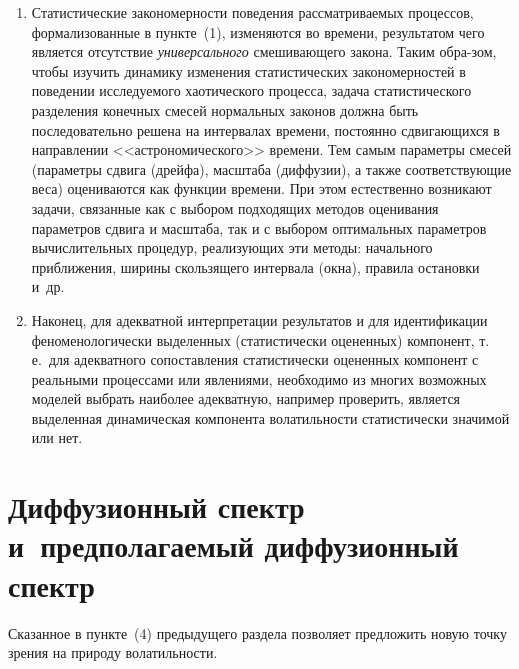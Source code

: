 \begin{multicols}{2}
\begin{enumerate}[(1)]
\item Статистические закономерности поведения
рассматриваемых процессов, формализованные в пункте~(1),
изменяются во времени, результатом чего является отсутствие {\it
универсального} сме\-ши\-ва\-юще\-го закона. Таким обра-\linebreak зом, чтобы изучить
динамику изменения статистических закономерностей в поведении\linebreak
ис\-сле\-ду\-емо\-го хаотического процесса, задача статистического
разделения конечных смесей нормальных законов должна быть
последовательно решена на интервалах времени, постоянно
сдви\-га\-ющих\-ся в направлении <<астрономического>> времени. Тем самым
параметры смесей (параметры сдвига (дрейфа), масштаба (диффузии),
а также соответствующие веса) оцениваются как функции времени. При
этом естественно возникают задачи, связанные как с выбором
подходящих методов оценивания параметров сдвига и масштаба, так и
с выбором оптимальных па\-ра\-мет\-ров вычислительных процедур,
реализующих эти методы: начального приближения, ширины скользящего
интервала (окна), правила остановки и~др.

\item Наконец, для адекватной интерпретации результатов и
для идентификации феноменологически выделенных (статистически
оцененных) компонент, т.\,е.\ для адекватного сопоставления
статистически оцененных компонент с реальными процессами или
явлениями, необходимо из многих возможных моделей выбрать наиболее
адекватную, например проверить, является выделенная динамическая
компонента волатильности статистически значимой или нет.
\end{enumerate}

\section{Диффузионный спектр и~предполагаемый диффузионный
спектр}

Сказанное в пункте~(4) предыдущего раздела позволяет предложить
новую точку зрения на природу волатильности.


\end{multicols}
